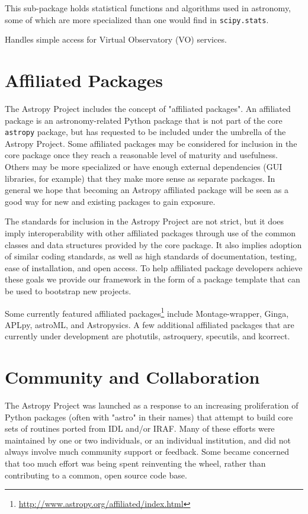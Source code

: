 \documentclass[11pt,twoside]{article}
\begin{document}
This sub-package holds statistical functions and algorithms used in astronomy,
some of which are more specialized than one would find in
\texttt{scipy.stats}.


Handles simple access for Virtual Observatory (VO) services.

\section{Affiliated Packages}

The Astropy Project includes the concept of "affiliated packages".  An
affiliated package is an astronomy-related Python package that is not part of
the core \texttt{astropy} package, but has requested to be included under the
umbrella of the Astropy Project.  Some affiliated packages may be considered
for inclusion in the core package once they reach a reasonable level of
maturity and usefulness.  Others may be more specialized or have enough
external dependencies (GUI libraries, for example) that they make more sense as
separate packages.  In general we hope that becoming an Astropy affiliated
package will be seen as a good way for new and existing packages to gain
exposure.

The standards for inclusion in the Astropy Project are not strict, but it does
imply interoperability with other affiliated packages through use of the common
classes and data structures provided by the core package.  It also implies
adoption of similar coding standards, as well as high standards of
documentation, testing, ease of installation, and open access.  To help
affiliated package developers achieve these goals we provide our framework in
the form of a package template that can be used to bootstrap new projects.

Some currently featured affiliated
packages\footnote{\url{http://www.astropy.org/affiliated/index.html}} include
Montage-wrapper, Ginga, APLpy, astroML, and Astropysics.  A few additional
affiliated packages that are currently under development are photutils,
astroquery, specutils, and kcorrect.

\section{Community and Collaboration}

The Astropy Project was launched as a response to an increasing proliferation
of Python packages (often with "astro" in their names) that attempt to build
core sets of routines ported from IDL and/or IRAF.  Many of these efforts were
maintained by one or two individuals, or an individual institution, and did not
always involve much community support or feedback.  Some became concerned that
too much effort was being spent reinventing the wheel, rather than contributing
to a common, open source code base.
\end{document}
